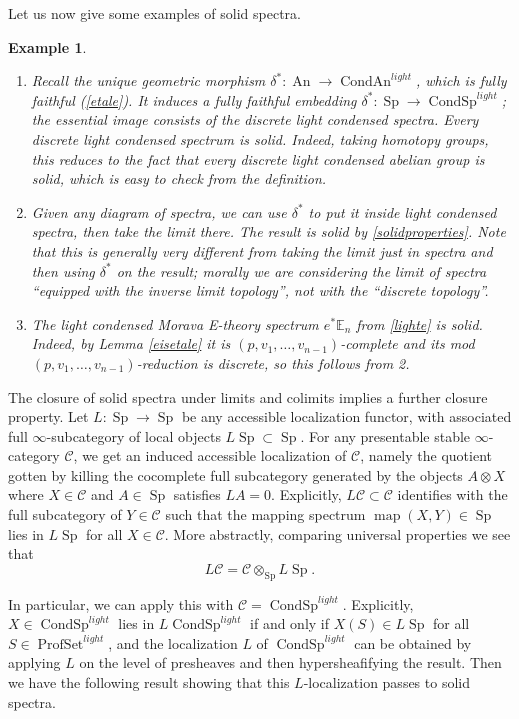 \documentclass[12pt]{article}
\newtheorem{example}[theorem]{Example}
\newcommand{\on}{\operatorname}
\begin{document}
Let us now give some examples of solid spectra.

\begin{example}\label{solidexamples}
\begin{enumerate}
\item Recall the unique geometric morphism $\delta^\ast: \on{An}\to\on{CondAn}^{light}$, which is fully faithful (\ref{etale}).  It induces a fully faithful embedding $\delta^\ast:\on{Sp}\to\on{CondSp}^{light}$; the essential image consists of the \emph{discrete} light condensed spectra.  Every discrete light condensed spectrum is solid.  Indeed, taking homotopy groups, this reduces to the fact that every discrete light condensed abelian group is solid, which is easy to check from the definition.
\item Given any diagram of spectra, we can use $\delta^\ast$ to put it inside light condensed spectra, then take the limit there.  The result is solid by \ref{solidproperties}.  Note that this is generally very different from taking the limit just in spectra and then using $\delta^\ast$ on the result; morally we are considering the limit of spectra ``equipped with the inverse limit topology'', not with the ``discrete topology''.
\item The light condensed Morava E-theory spectrum $e^\ast \mathbb{E}_n$ from \ref{lighte} is solid.  Indeed, by Lemma \ref{eisetale} it is $(p,v_1,\ldots,v_{n-1})$-complete and its mod $(p,v_1,\ldots,v_{n-1})$-reduction is discrete, so this follows from 2.
\end{enumerate}
\end{example}

The closure of solid spectra under limits and colimits implies a further closure property.  Let $L:\on{Sp}\to\on{Sp}$ be any accessible localization functor, with associated full $\infty$-subcategory of local objects $L\on{Sp}\subset\on{Sp}$.  For any presentable stable $\infty$-category $\mathcal{C}$, we get an induced accessible localization of $\mathcal{C}$, namely the quotient gotten by killing the cocomplete full subcategory generated by the objects $A\otimes X$ where $X\in\mathcal{C}$ and $A\in\on{Sp}$ satisfies $LA=0$.  Explicitly, $L\mathcal{C}\subset\mathcal{C}$ identifies with the full subcategory of $Y\in \mathcal{C}$ such that the mapping spectrum $\on{map}(X,Y)\in\on{Sp}$ lies in $L\on{Sp}$ for all $X\in\mathcal{C}$.  More abstractly, comparing universal properties we see that
$$L\mathcal{C}=\mathcal{C}\otimes_{\on{Sp}}L\on{Sp}.$$

In particular, we can apply this with $\mathcal{C}=\on{CondSp}^{light}$.  Explicitly, $X\in\on{CondSp}^{light}$ lies in $L\on{CondSp}^{light}$ if and only if $X(S)\in L\on{Sp}$ for all $S\in\on{ProfSet}^{light}$, and the localization $L$ of $\on{CondSp}^{light}$ can be obtained by applying $L$ on the level of presheaves and then hypersheafifying the result.   Then we have the following result showing that this $L$-localization passes to solid spectra.
\end{document}
